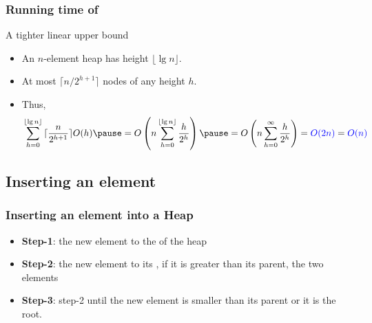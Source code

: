 \documentclass[UTF8,11pt]{beamer}
\begin{document}
\begin{frame}[t]
\frametitle{Running time of }
\begin{center}
	\begin{block}{A tighter linear upper bound}
		\begin{itemize}
			\pause
			\item An $n$-element heap has height {\color{teal}$\lfloor\lg{n}\rfloor$}.
			
			\pause
			\item At most {\color{teal}$\lceil n/{2^{h+1}}\rceil$} nodes of any height $h$.
			
			\pause
			\item Thus,
			\[
				\sum\limits_{h=0}^{\lfloor\lg{n}\rfloor}{\lceil\frac{n}{2^{h+1}}\rceil O(h)}
				\pause
				=O\left(n \sum\limits_{h=0}^{\lfloor\lg{n}\rfloor}{\frac{h}{2^h}}\right)\pause
				=O\left(n \sum\limits_{h=0}^{\infty}{\frac{h}{2^h}}\right)
				={\color{blue}O(2n)}
				={\color{blue}O(n)}
			\]
			
			\pause
		\end{itemize}
	\end{block}
\end{center}
\end{frame}

\subsection{Inserting an element}
\begin{frame}
\frametitle{Inserting an element into a Heap}
\begin{center}

	\begin{itemize}
		\item \textbf{\color{blue}Step-1}:  the new element to the  of the heap
		\item \textbf{\color{blue}Step-2}:  the new element to its , if it is greater than its parent,  the two elements
		\item \textbf{\color{blue}Step-3}:  step-2 until the new element is smaller than its parent or it is the root.
	\end{itemize}
\end{center}
\end{frame}
\end{document}
